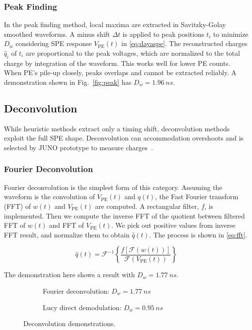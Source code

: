 \subsubsection{Peak Finding}
\label{sec:findpeak}

In the peak finding method, local maxima are extracted in Savitzky-Golay smoothed waveforms.  A minus shift $\Delta t$ is applied to peak positions $t_i$ to minimize $D_w$ considering SPE response $V_\mathrm{PE}(t)$ in \eqref{eq:dayaspe}. The reconstructed charges $\hat{q}_i$ of $t_i$ are proportional to the peak voltages, which are normalized to the total charge by integration of the waveform.  This works well for lower PE counts. When PE's pile-up closely, peaks overlaps and cannot be extracted reliably. A demonstration shown in Fig.~\ref{fig:peak} has $D_w = \SI{1.96}{ns}$. 

\subsection{Deconvolution}
While heuristic methods extract only a timing shift, deconvolution methods exploit the full SPE shape.  Deconvolution can accommodation overshoots and is selected by JUNO prototype to measure charges~\cite{zhang_comparison_2019}.

\subsubsection{Fourier Deconvolution}

Fourier deconvolution is the simplest form of this category.  Assuming the waveform is the convolution of $V_\mathrm{PE}(t)$ and $q(t)$, the Fast Fourier transform (FFT) of $w(t)$ and $V_\mathrm{PE}(t)$ are computed. A rectangular filter, $f$, is implemented. Then we compute the inverse FFT of the quotient between filtered FFT of $w(t)$ and FFT of $V_\mathrm{PE}(t)$. We pick out positive values from inverse FFT result, and normalize them to obtain $\hat{q}(t)$. The process is shown in \eqref{eq:fft}. 

\begin{equation}
    \hat{q}(t) = \mathcal{F}^{-1}\left\{\frac{f[\mathcal{F}(w(t))]}{\mathcal{F}(V_\mathrm{PE}(t))}\right\}
    \label{eq:fft}
\end{equation}

The demonstration here shows a result with $D_w = \SI{1.77}{ns}$. 

\begin{figure}[H]
  \begin{subfigure}{0.5\textwidth}
    \centering
    \scalebox{0.36}{}
    \caption{Fourier deconvolution: $D_w = \SI{1.77}{ns}$}
  \end{subfigure}
  \begin{subfigure}{0.5\textwidth}
    \centering
    \scalebox{0.36}{}
    \caption{Lucy direct demodulation: $D_w = \SI{0.95}{ns}$}
  \end{subfigure}
  \caption{Deconvolution demonstrations.}
\end{figure}


